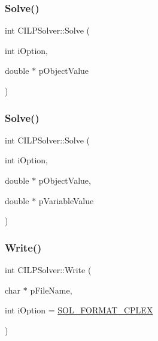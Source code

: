 \mbox{\label{classCILPSolver_a1de0df19fea8757e39642457f35fb693}} 
\subsubsection{\texorpdfstring{Solve()}{Solve()}\hspace{0.1cm}{\footnotesize\ttfamily [1/2]}}
{\footnotesize\ttfamily int C\+I\+L\+P\+Solver\+::\+Solve (\begin{DoxyParamCaption}\item[{int}]{i\+Option,  }\item[{double $\ast$}]{p\+Object\+Value }\end{DoxyParamCaption})}

\mbox{\label{classCILPSolver_a36ff606e74d53c1f27af593ffff7286d}} 
\subsubsection{\texorpdfstring{Solve()}{Solve()}\hspace{0.1cm}{\footnotesize\ttfamily [2/2]}}
{\footnotesize\ttfamily int C\+I\+L\+P\+Solver\+::\+Solve (\begin{DoxyParamCaption}\item[{int}]{i\+Option,  }\item[{double $\ast$}]{p\+Object\+Value,  }\item[{double $\ast$}]{p\+Variable\+Value }\end{DoxyParamCaption})}

\mbox{\label{classCILPSolver_a47313561701dd5a8a0588ed8ecca2ad0}} 
\subsubsection{\texorpdfstring{Write()}{Write()}}
{\footnotesize\ttfamily int C\+I\+L\+P\+Solver\+::\+Write (\begin{DoxyParamCaption}\item[{char $\ast$}]{p\+File\+Name,  }\item[{int}]{i\+Option = {\ttfamily \mbox{\hyperlink{ILPSolver_8h_acee7a96f3deaccde51231b3aa7c8bcb2}{S\+O\+L\+\_\+\+F\+O\+R\+M\+A\+T\+\_\+\+C\+P\+L\+EX}}} }\end{DoxyParamCaption})}



